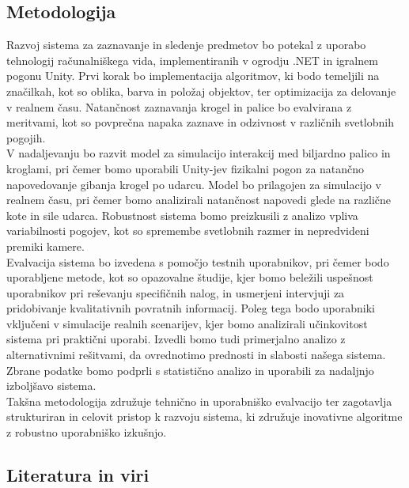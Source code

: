 \documentclass[a4paper, 12pt]{article}
\begin{document}
\subsection{Metodologija}
Razvoj sistema za zaznavanje in sledenje predmetov bo potekal z uporabo tehnologij računalniškega vida, implementiranih v ogrodju .NET in igralnem pogonu Unity. Prvi korak bo implementacija algoritmov, ki bodo temeljili na značilkah, kot so oblika, barva in položaj objektov, ter optimizacija za delovanje v realnem času. Natančnost zaznavanja krogel in palice bo evalvirana z meritvami, kot so povprečna napaka zaznave in odzivnost v različnih svetlobnih pogojih.
\\
V nadaljevanju bo razvit model za simulacijo interakcij med biljardno palico in kroglami, pri čemer bomo uporabili Unity-jev fizikalni pogon za natančno napovedovanje gibanja krogel po udarcu. Model bo prilagojen za simulacijo v realnem času, pri čemer bomo analizirali natančnost napovedi glede na različne kote in sile udarca. Robustnost sistema bomo preizkusili z analizo vpliva variabilnosti pogojev, kot so spremembe svetlobnih razmer in nepredvideni premiki kamere.
\\
Evalvacija sistema bo izvedena s pomočjo testnih uporabnikov, pri čemer bodo uporabljene metode, kot so opazovalne študije, kjer bomo beležili uspešnost uporabnikov pri reševanju specifičnih nalog, in usmerjeni intervjuji za pridobivanje kvalitativnih povratnih informacij. Poleg tega bodo uporabniki vključeni v simulacije realnih scenarijev, kjer bomo analizirali učinkovitost sistema pri praktični uporabi. Izvedli bomo tudi primerjalno analizo z alternativnimi rešitvami, da ovrednotimo prednosti in slabosti našega sistema. Zbrane podatke bomo podprli s statistično analizo in uporabili za nadaljnjo izboljšavo sistema.
\\
Takšna metodologija združuje tehnično in uporabniško evalvacijo ter zagotavlja strukturiran in celovit pristop k razvoju sistema, ki združuje inovativne algoritme z robustno uporabniško izkušnjo.
\newpage
\subsection{Literatura in viri}
\label{literatura}
\renewcommand\refname{}
\vspace{-50px}


\end{document}
